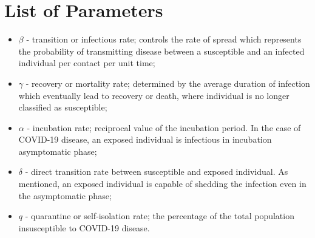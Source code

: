 \documentclass[conference]{IEEEtran}
\begin{document}
\section{List of Parameters}
\label{sec.params}
\begin{itemize}
    \item $\beta$ - transition or infectious rate; controls the rate of spread which represents the probability of transmitting disease between a susceptible and an infected individual per contact per unit time;
    \item $\gamma$ - recovery or mortality rate; determined by the average duration of infection which eventually lead to recovery or death, where individual is no longer classified as susceptible; 
    \item $\alpha$ - incubation rate; reciprocal value of the incubation  period. In the case of COVID-19 disease, an exposed individual is infectious in incubation asymptomatic phase;
    \item $\delta$ - direct transition rate between susceptible and exposed individual. As mentioned, an exposed individual is capable of shedding the infection even in the asymptomatic phase;
    \item $q$ - quarantine or self-isolation rate; the percentage of the total population insusceptible to COVID-19 disease.
\end{itemize}




\end{document}
